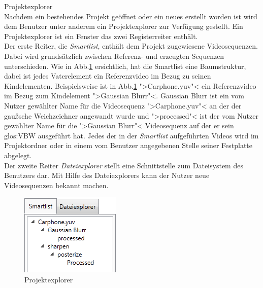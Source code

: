  Projektexplorer \\
Nachdem ein bestehendes Projekt geöffnet oder ein neues erstellt worden ist wird dem
Benutzer unter anderem ein Projektexplorer zur Verfügung gestellt. Ein Projektexplorer ist ein 
Fenster das zwei Registerreiter enthält. \\
Der erste Reiter, die \emph{Smartlist}, enthält dem Projekt zugewiesene Videosequenzen. Dabei wird
grundsätzlich zwischen Referenz- und erzeugten Sequenzen unterschieden. Wie in Abb.\ref{pExplorer}
ersichtlich, hat die Smartlist eine Baumstruktur, dabei ist jedes Vaterelement
ein Referenzvideo im Bezug zu seinen Kindelementen. Beispielsweise ist in Abb.\ref{pExplorer}
">Carphone.yuv"< ein Referenzvideo im Bezug zum Kindelement ">Gaussian Blurr"<. Gaussian Blurr ist ein
vom Nutzer gewählter Name für die Videosequenz ">Carphone.yuv"< an der der gaußsche Weichzeichner angewandt
wurde und ">processed"< ist der vom Nutzer gewählter Name für die ">Gaussian Blurr"< Videosequenz auf
der er sein \gls{glos:VBW} ausgeführt hat. Jedes der in der \emph{Smartlist} aufgeführten Videos wird im Projektordner oder in einem vom Benutzer angegebenen Stelle seiner Festplatte abgelegt.\\
Der zweite Reiter \emph{Dateiexplorer} stellt eine Schnittstelle zum Dateisystem des Benutzers dar. Mit Hilfe
des Dateiexplorers kann der Nutzer \projektTitel neue Videosequenzen bekannt machen.
\begin{figure}[h]
\includegraphics[scale=1]{bilder/projektexplorer.png}
\caption{Projektexplorer}
\label{pExplorer}
\end{figure}

